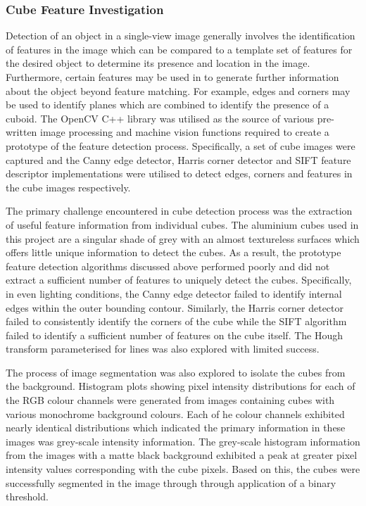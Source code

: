 \subsubsection{Cube Feature Investigation} \label{sec:Cube Feature Investigation}

Detection of an object in a single-view image generally involves the identification of features in the image which can be compared to a template set of features for the desired object to determine its presence and location in the image. Furthermore, certain features may be used in to generate further information about the object beyond feature matching. For example, edges and corners may be used to identify planes which are combined to identify the presence of a cuboid. The OpenCV C++ library was utilised as the source of various pre-written image processing and machine vision functions required to create a prototype of the feature detection process. Specifically, a set of cube images were captured and the Canny edge detector, Harris corner detector and SIFT feature descriptor implementations were utilised to detect edges, corners and features in the cube images respectively. 

The primary challenge encountered in cube detection process was the extraction of useful feature information from individual cubes. The aluminium cubes used in this project are a singular shade of grey with an almost textureless surfaces which offers little unique information to detect the cubes. As a result, the prototype feature detection algorithms discussed above performed poorly and did not extract a sufficient number of features to uniquely detect the cubes. Specifically, in even lighting conditions, the Canny edge detector failed to identify internal edges within the outer bounding contour. Similarly, the Harris corner detector failed to consistently identify the corners of the cube while the SIFT algorithm failed to identify a sufficient number of features on the cube itself. The Hough transform parameterised for lines was also explored with limited success.  

The process of image segmentation was also explored to isolate the cubes from the background. Histogram plots showing pixel intensity distributions for each of the RGB colour channels were generated from images containing cubes with various monochrome background colours. Each of he colour channels exhibited nearly identical distributions which indicated the primary information in these images was grey-scale intensity information. The grey-scale histogram information from the images with a matte black background exhibited a peak at greater pixel intensity values corresponding with the cube pixels. Based on this, the cubes were successfully segmented in the image through through application of a binary threshold. 

